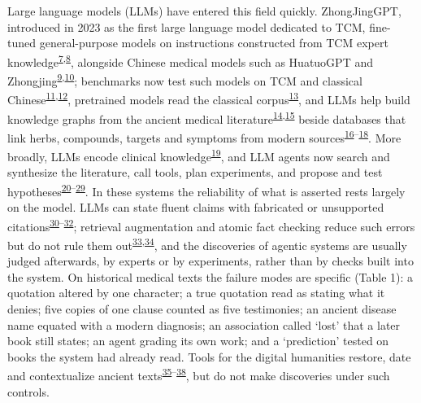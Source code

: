 \documentclass[
]{article}
\begin{document}
Large language models (LLMs) have entered this field quickly.
ZhongJingGPT, introduced in 2023 as the first large language model
dedicated to TCM, fine-tuned general-purpose models on instructions
constructed from TCM expert
knowledge\textsuperscript{\protect\hyperlink{ref-kang2025zhongjinggpt}{7},\protect\hyperlink{ref-cmlm2023zhongjing}{8}},
alongside Chinese medical models such as HuatuoGPT and
Zhongjing\textsuperscript{\protect\hyperlink{ref-zhang2023huatuogpt}{9},\protect\hyperlink{ref-yang2024zhongjing}{10}};
benchmarks now test such models on TCM and classical
Chinese\textsuperscript{\protect\hyperlink{ref-yue2024tcmbench}{11},\protect\hyperlink{ref-zhou2023wyweb}{12}},
pretrained models read the classical
corpus\textsuperscript{\protect\hyperlink{ref-wang2023gujibert}{13}},
and LLMs help build knowledge graphs from the ancient medical
literature\textsuperscript{\protect\hyperlink{ref-li2025tcmrdkg}{14},\protect\hyperlink{ref-xiang2025kgclassics}{15}}
beside databases that link herbs, compounds, targets and symptoms from
modern
sources\textsuperscript{\protect\hyperlink{ref-ru2014tcmsp}{16}--\protect\hyperlink{ref-fang2021herb}{18}}.
More broadly, LLMs encode clinical
knowledge\textsuperscript{\protect\hyperlink{ref-singhal2023clinical}{19}},
and LLM agents now search and synthesize the literature, call tools,
plan experiments, and propose and test
hypotheses\textsuperscript{\protect\hyperlink{ref-yao2023react}{20}--\protect\hyperlink{ref-wang2024agentsurvey}{29}}.
In these systems the reliability of what is asserted rests largely on
the model. LLMs can state fluent claims with fabricated or unsupported
citations\textsuperscript{\protect\hyperlink{ref-ji2023hallucination}{30}--\protect\hyperlink{ref-thirunavukarasu2023llm}{32}};
retrieval augmentation and atomic fact checking reduce such errors but
do not rule them
out\textsuperscript{\protect\hyperlink{ref-lewis2020rag}{33},\protect\hyperlink{ref-min2023factscore}{34}},
and the discoveries of agentic systems are usually judged afterwards, by
experts or by experiments, rather than by checks built into the system.
On historical medical texts the failure modes are specific (Table 1): a
quotation altered by one character; a true quotation read as stating
what it denies; five copies of one clause counted as five testimonies;
an ancient disease name equated with a modern diagnosis; an association
called `lost' that a later book still states; an agent grading its own
work; and a `prediction' tested on books the system had already read.
Tools for the digital humanities restore, date and contextualize ancient
texts\textsuperscript{\protect\hyperlink{ref-assael2022ithaca}{35}--\protect\hyperlink{ref-sturgeon2020ctext}{38}},
but do not make discoveries under such controls.
\end{document}

